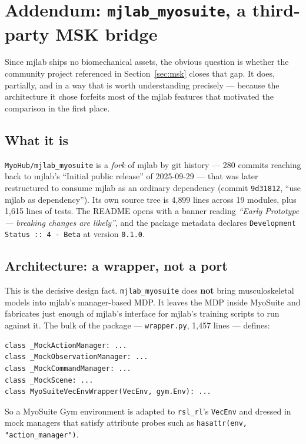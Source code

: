 \documentclass[11pt,a4paper]{article}
\begin{document}
\section{Addendum: \texttt{mjlab\_myosuite}, a third-party MSK bridge}
\label{sec:mjlabmyo}

Since mjlab ships no biomechanical assets, the obvious question is whether the community
project referenced in Section~\ref{sec:msk} closes that gap. It does, partially, and in a
way that is worth understanding precisely --- because the architecture it chose forfeits
most of the mjlab features that motivated the comparison in the first place.

\subsection{What it is}

\texttt{MyoHub/mjlab\_myosuite} is a \emph{fork} of mjlab by git history --- 280 commits
reaching back to mjlab's ``Initial public release'' of 2025-09-29 --- that was later
restructured to consume mjlab as an ordinary dependency (commit \texttt{9d31812},
``use mjlab as dependency''). Its own source tree is 4{,}899 lines across 19 modules, plus
1{,}615 lines of tests. The README opens with a banner reading
\emph{``Early Prototype --- breaking changes are likely''}, and the package metadata
declares \texttt{Development Status :: 4 - Beta} at version \texttt{0.1.0}.

\subsection{Architecture: a wrapper, not a port}

This is the decisive design fact. \texttt{mjlab\_myosuite} does \textbf{not} bring
musculoskeletal models into mjlab's manager-based MDP. It leaves the MDP inside MyoSuite
and fabricates just enough of mjlab's interface for mjlab's training scripts to run
against it. The bulk of the package --- \texttt{wrapper.py}, 1{,}457 lines --- defines:

\begin{lstlisting}
class _MockActionManager: ...
class _MockObservationManager: ...
class _MockCommandManager: ...
class _MockScene: ...
class MyoSuiteVecEnvWrapper(VecEnv, gym.Env): ...
\end{lstlisting}

\noindent
So a MyoSuite Gym environment is adapted to \texttt{rsl\_rl}'s \texttt{VecEnv} and dressed
in mock managers that satisfy attribute probes such as
\texttt{hasattr(env, "action\_manager")}.
\end{document}
